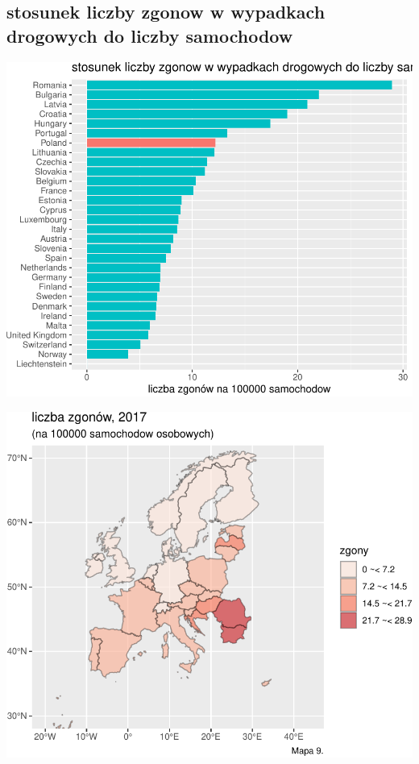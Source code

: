 \documentclass[
]{article}
\begin{document}
\hypertarget{stosunek-liczby-zgonow-w-wypadkach-drogowych-do-liczby-samochodow}{%
\subsection{stosunek liczby zgonow w wypadkach drogowych do liczby
samochodow}\label{stosunek-liczby-zgonow-w-wypadkach-drogowych-do-liczby-samochodow}}

\begin{flushleft}\includegraphics{raport_wypadki_files/figure-latex/unnamed-chunk-33-1} \end{flushleft}

\begin{flushleft}\includegraphics{raport_wypadki_files/figure-latex/unnamed-chunk-33-2} \end{flushleft}
\end{document}
